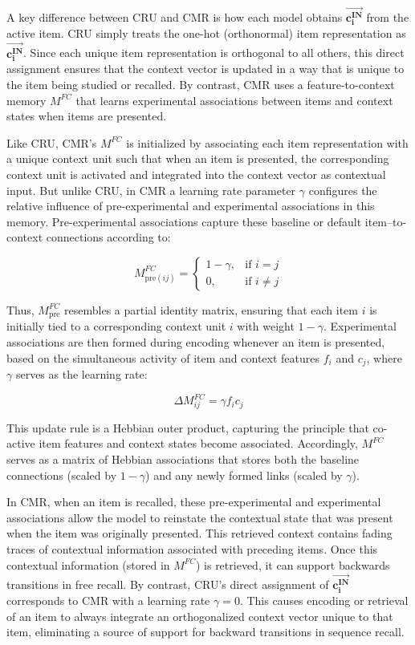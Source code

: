 \documentclass[
  letterpaper,
  11pt,
  english,
  singlespacing,
  headsepline]{MastersDoctoralThesis}
\begin{document}
A key difference between CRU and CMR is how each model obtains
\(\mathbf{\vec{c_i^{IN}}}\) from the active item. CRU simply treats the
one-hot (orthonormal) item representation as
\(\mathbf{\vec{c_i^{IN}}}\). Since each unique item representation is
orthogonal to all others, this direct assignment ensures that the
context vector is updated in a way that is unique to the item being
studied or recalled. By contrast, CMR uses a feature-to-context memory
\(M^{FC}\) that learns experimental associations between items and
context states when items are presented.

Like CRU, CMR's \(M^{FC}\) is initialized by associating each item
representation with a unique context unit such that when an item is
presented, the corresponding context unit is activated and integrated
into the context vector as contextual input. But unlike CRU, in CMR a
learning rate parameter \(\gamma\) configures the relative influence of
pre-experimental and experimental associations in this memory.
Pre-experimental associations capture these baseline or default
item--to-context connections according to:

\[
M^{FC}_{\text{pre}(ij)} = \begin{cases} 
1 - \gamma, & \text{if } i=j \\ 
0, & \text{if } i \neq j 
\end{cases}
\]

Thus, \(M^{FC}_\text{pre}\) resembles a partial identity matrix,
ensuring that each item \(i\) is initially tied to a corresponding
context unit \(i\) with weight \(1 - \gamma\). Experimental associations
are then formed during encoding whenever an item is presented, based on
the simultaneous activity of item and context features \(f_i\) and
\(c_j\), where \(\gamma\) serves as the learning rate:

\[
\Delta M^{FC}_{ij} = \gamma f_i c_j
\]

This update rule is a Hebbian outer product, capturing the principle
that co-active item features and context states become associated.
Accordingly, \(M^{FC}\) serves as a matrix of Hebbian associations that
stores both the baseline connections (scaled by \(1 - \gamma\)) and any
newly formed links (scaled by \(\gamma\)).

In CMR, when an item is recalled, these pre-experimental and
experimental associations allow the model to reinstate the contextual
state that was present when the item was originally presented. This
retrieved context contains fading traces of contextual information
associated with preceding items. Once this contextual information
(stored in \(M^{FC}\)) is retrieved, it can support backwards
transitions in free recall. By contrast, CRU's direct assignment of
\(\mathbf{\vec{c_i^{IN}}}\) corresponds to CMR with a learning rate
\(\gamma=0\). This causes encoding or retrieval of an item to always
integrate an orthogonalized context vector unique to that item,
eliminating a source of support for backward transitions in sequence
recall.
\end{document}
